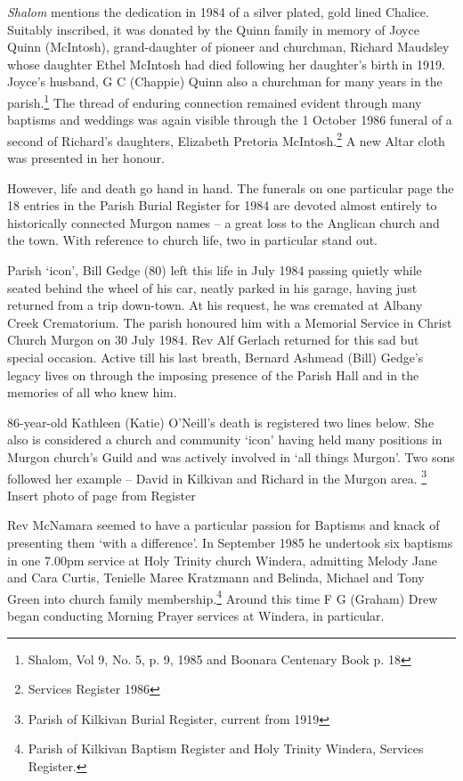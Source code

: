 \emph{Shalom} mentions the dedication in 1984 of a silver plated, gold lined Chalice. Suitably inscribed, it was donated by the Quinn family in memory of Joyce Quinn (McIntosh), grand-daughter of pioneer and churchman, Richard Maudsley whose daughter Ethel McIntosh had died following her daughter's birth in 1919. Joyce's husband, G C (Chappie) Quinn also a churchman for many years in the parish.\footnote{Shalom, Vol 9, No. 5, p. 9, 1985 and Boonara Centenary Book p. 18} The thread of enduring connection remained evident through many baptisms and weddings was again visible through the 1 October 1986 funeral of a second of Richard's daughters, Elizabeth Pretoria McIntosh.\footnote{Services Register 1986} A new Altar cloth was presented in her honour.

However, life and death go hand in hand. The funerals on one particular page the 18 entries in the Parish Burial Register for 1984 are devoted almost entirely to historically connected Murgon names -- a great loss to the Anglican church and the town. With reference to church life, two in particular stand out.

Parish `icon', Bill Gedge (80) left this life in July 1984 passing quietly while seated behind the wheel of his car, neatly parked in his garage, having just returned from a trip down-town. At his request, he was cremated at Albany Creek Crematorium. The parish honoured him with a Memorial Service in Christ Church Murgon on 30 July 1984. Rev Alf Gerlach returned for this sad but special occasion. Active till his last breath, Bernard Ashmead (Bill) Gedge's legacy lives on through the imposing presence of the Parish Hall and in the memories of all who knew him.

86-year-old Kathleen (Katie) O'Neill's death is registered two lines below. She also is considered a church and community `icon' having held many positions in Murgon church's Guild and was actively involved in `all things Murgon'. Two sons followed her example -- David in Kilkivan and Richard in the Murgon area. \footnote{Parish of Kilkivan Burial Register, current from 1919} Insert photo of page from Register

Rev McNamara seemed to have a particular passion for Baptisms and knack of presenting them `with a difference'. In September 1985 he undertook six baptisms in one 7.00pm service at Holy Trinity church Windera, admitting Melody Jane and Cara Curtis, Tenielle Maree Kratzmann and Belinda, Michael and Tony Green into church family membership.\footnote{Parish of Kilkivan Baptism Register and Holy Trinity Windera, Services Register.} Around this time F G (Graham) Drew began conducting Morning Prayer services at Windera, in particular.

